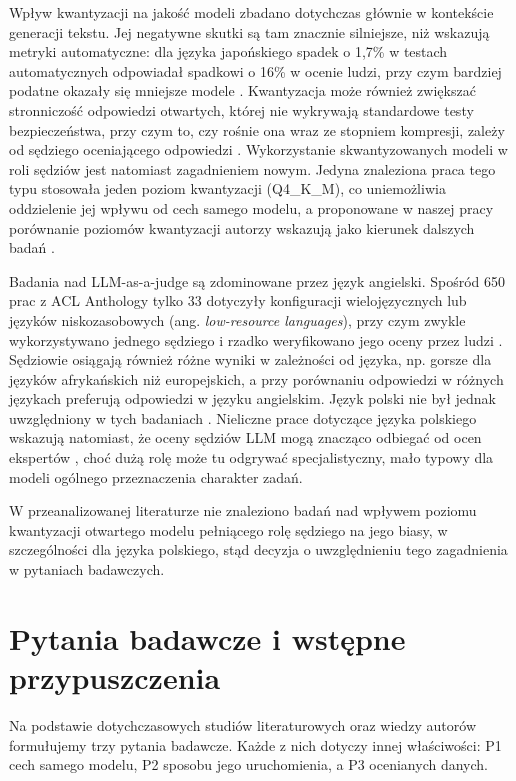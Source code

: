 \documentclass[11pt,a4paper]{article}
\begin{document}
Wpływ kwantyzacji na jakość modeli zbadano dotychczas głównie w kontekście generacji tekstu. Jej negatywne skutki są tam znacznie silniejsze, niż wskazują metryki automatyczne: dla języka japońskiego spadek o 1,7\% w testach automatycznych odpowiadał spadkowi o 16\% w ocenie ludzi, przy czym bardziej podatne okazały się mniejsze modele \cite{marchisioetal2024a}. Kwantyzacja może również zwiększać stronniczość odpowiedzi otwartych, której nie wykrywają standardowe testy bezpieczeństwa, przy czym to, czy rośnie ona wraz ze stopniem kompresji, zależy od sędziego oceniającego odpowiedzi \cite{ferrara2026}. Wykorzystanie skwantyzowanych modeli w roli sędziów jest natomiast zagadnieniem nowym. Jedyna znaleziona praca tego typu stosowała jeden poziom kwantyzacji (Q4\_K\_M), co uniemożliwia oddzielenie jej wpływu od cech samego modelu, a proponowane w naszej pracy porównanie poziomów kwantyzacji autorzy wskazują jako kierunek dalszych badań \cite{angheletal2026}.

Badania nad LLM-as-a-judge są zdominowane przez język angielski. Spośród 650 prac z ACL Anthology tylko 33 dotyczyły konfiguracji wielojęzycznych lub języków niskozasobowych (ang. \emph{low-resource languages}), przy czym zwykle wykorzystywano jednego sędziego i rzadko weryfikowano jego oceny przez ludzi \cite{dogruozetal2026a}. Sędziowie osiągają również różne wyniki w zależności od języka, np. gorsze dla języków afrykańskich niż europejskich, a przy porównaniu odpowiedzi w różnych językach preferują odpowiedzi w języku angielskim. Język polski nie był jednak uwzględniony w tych badaniach \cite{zhouetal2026}. Nieliczne prace dotyczące języka polskiego wskazują natomiast, że oceny sędziów LLM mogą znacząco odbiegać od ocen ekspertów \cite{karpetal2026}, choć dużą rolę może tu odgrywać specjalistyczny, mało typowy dla modeli ogólnego przeznaczenia charakter zadań.

W przeanalizowanej literaturze nie znaleziono badań nad wpływem poziomu kwantyzacji otwartego modelu pełniącego rolę sędziego na jego biasy, w szczególności dla języka polskiego, stąd decyzja o uwzględnieniu tego zagadnienia w pytaniach badawczych.

\section*{Pytania badawcze i wstępne przypuszczenia}
Na podstawie dotychczasowych studiów literaturowych oraz wiedzy autorów formułujemy trzy pytania badawcze. Każde z nich dotyczy innej właściwości: P1 cech samego modelu, P2 sposobu jego uruchomienia, a P3 ocenianych danych.
\end{document}
